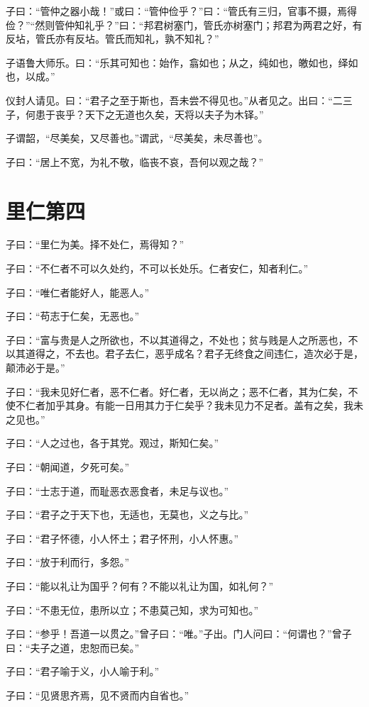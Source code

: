 \documentclass[twoside,openany]{book}
\begin{document}
子曰：“管仲之器小哉！”或曰：“管仲俭乎？”曰：“管氏有三归，官事不摄，焉得俭？”“然则管仲知礼乎？”曰：“邦君树塞门，管氏亦树塞门；邦君为两君之好，有反坫，管氏亦有反坫。管氏而知礼，孰不知礼？”

子语鲁大师乐。曰：“乐其可知也：始作，翕如也；从之，纯如也，皦如也，绎如也，以成。”

仪封人请见。曰：“君子之至于斯也，吾未尝不得见也。”从者见之。出曰：“二三子，何患于丧乎？天下之无道也久矣，天将以夫子为木铎。”

子谓韶，“尽美矣，又尽善也。”谓武，“尽美矣，未尽善也”。

子曰：“居上不宽，为礼不敬，临丧不哀，吾何以观之哉？”

\chapter{里仁第四}\label{ch4}

子曰：“里仁为美。择不处仁，焉得知？”

子曰：“不仁者不可以久处约，不可以长处乐。仁者安仁，知者利仁。”

子曰：“唯仁者能好人，能恶人。”

子曰：“苟志于仁矣，无恶也。”

子曰：“富与贵是人之所欲也，不以其道得之，不处也；贫与贱是人之所恶也，不以其道得之，不去也。君子去仁，恶乎成名？君子无终食之间违仁，造次必于是，颠沛必于是。”

子曰：“我未见好仁者，恶不仁者。好仁者，无以尚之；恶不仁者，其为仁矣，不使不仁者加乎其身。有能一日用其力于仁矣乎？我未见力不足者。盖有之矣，我未之见也。”

子曰：“人之过也，各于其党。观过，斯知仁矣。”

子曰：“朝闻道，夕死可矣。”

子曰：“士志于道，而耻恶衣恶食者，未足与议也。”

子曰：“君子之于天下也，无适也，无莫也，义之与比。”

子曰：“君子怀德，小人怀土；君子怀刑，小人怀惠。”

子曰：“放于利而行，多怨。”

子曰：“能以礼让为国乎？何有？不能以礼让为国，如礼何？”

子曰：“不患无位，患所以立；不患莫己知，求为可知也。”

子曰：“参乎！吾道一以贯之。”曾子曰：“唯。”子出。门人问曰：“何谓也？”曾子曰：“夫子之道，忠恕而已矣。”

子曰：“君子喻于义，小人喻于利。”

子曰：“见贤思齐焉，见不贤而内自省也。”
\end{document}
